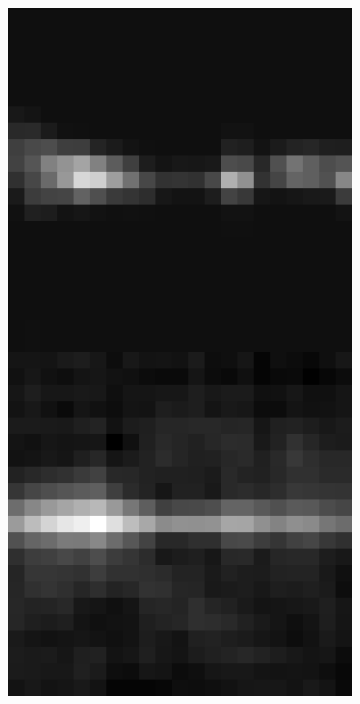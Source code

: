 \documentclass[10pt, letter]{article}
\begin{document}
\begin{figure}[h!]
\begin{subfigure}[t]{0.1\textwidth}
					\centering
					\includegraphics[width=\textwidth]{figures/inv3}
				\end{subfigure}	
				~
				\begin{subfigure}[t]{0.1\textwidth}
					\centering

\end{subfigure}
\end{figure}
\end{document}
